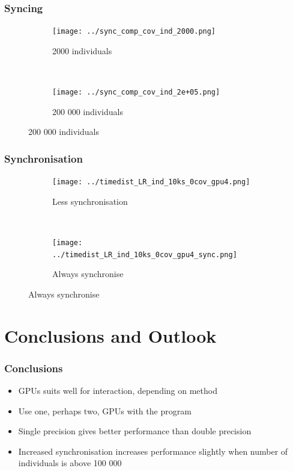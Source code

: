 \documentclass{beamer}
\begin{document}

\begin{frame}
\frametitle{Syncing}

\begin{figure}
        \centering
        \begin{subfigure}[b]{0.48\textwidth}
                \texttt{[image: ../sync\_comp\_cov\_ind\_2000.png]}
                \caption*{2000 individuals}
        \end{subfigure}%
        ~
        \begin{subfigure}[b]{0.48\textwidth}
                \texttt{[image: ../sync\_comp\_cov\_ind\_2e+05.png]}
                \caption*{200 000 individuals}
        \end{subfigure}
\end{figure}

\end{frame}

\begin{frame}
\frametitle{Synchronisation}

\begin{figure}
        \centering
        \begin{subfigure}[b]{0.48\textwidth}
                \texttt{[image: ../timedist\_LR\_ind\_10ks\_0cov\_gpu4.png]}
                \caption*{Less synchronisation}
        \end{subfigure}%
        ~
        \begin{subfigure}[b]{0.48\textwidth}
                \texttt{[image: ../timedist\_LR\_ind\_10ks\_0cov\_gpu4\_sync.png]}
                \caption*{Always synchronise}
        \end{subfigure}
\end{figure}

\end{frame}

\section{Conclusions and Outlook}

\begin{frame}
\frametitle{Conclusions}

\begin{itemize}
 \item GPUs suits well for interaction, depending on method
 \item Use one, perhaps two, GPUs with the program
 \item Single precision gives better performance than double precision
 \item Increased synchronisation increases performance slightly when number of individuals is above 100 000
\end{itemize}

\end{frame}
\end{document}
